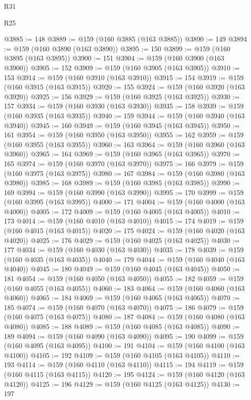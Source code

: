 \begin{lexlean}{R31}
\begin{lexlean}{R25}
\begin{coremodule}
{{{{{{{{{{{{{{{{{{{{{{{{{{{{{{{{{{{{{{{{{{{{{{{{{{{{{{{{{{{{{{{{{{{{{{{{{{{{{{{{{{{{{{{{{{{{{{{{{{{{{{{{{{{{{{{{{{{{{{{{{{{{{{{{{{{{{{{{{{{{{{{{{{{{{{{{{{{{{{{{{{{{{{{{{{{{{{{{{{{{{{{{{{{{{{{{{{{{{{{@3885 := 148
@3889 := @159 (@160 @3885 (@163 @3885))
@3890 := 149
@3894 := @159 (@160 @3890 (@163 @3890))
@3895 := 150
@3899 := @159 (@160 @3895 (@163 @3895))
@3900 := 151
@3904 := @159 (@160 @3900 (@163 @3900))
@3905 := 152
@3909 := @159 (@160 @3905 (@163 @3905))
@3910 := 153
@3914 := @159 (@160 @3910 (@163 @3910))
@3915 := 154
@3919 := @159 (@160 @3915 (@163 @3915))
@3920 := 155
@3924 := @159 (@160 @3920 (@163 @3920))
@3925 := 156
@3929 := @159 (@160 @3925 (@163 @3925))
@3930 := 157
@3934 := @159 (@160 @3930 (@163 @3930))
@3935 := 158
@3939 := @159 (@160 @3935 (@163 @3935))
@3940 := 159
@3944 := @159 (@160 @3940 (@163 @3940))
@3945 := 160
@3949 := @159 (@160 @3945 (@163 @3945))
@3950 := 161
@3954 := @159 (@160 @3950 (@163 @3950))
@3955 := 162
@3959 := @159 (@160 @3955 (@163 @3955))
@3960 := 163
@3964 := @159 (@160 @3960 (@163 @3960))
@3965 := 164
@3969 := @159 (@160 @3965 (@163 @3965))
@3970 := 165
@3974 := @159 (@160 @3970 (@163 @3970))
@3975 := 166
@3979 := @159 (@160 @3975 (@163 @3975))
@3980 := 167
@3984 := @159 (@160 @3980 (@163 @3980))
@3985 := 168
@3989 := @159 (@160 @3985 (@163 @3985))
@3990 := 169
@3994 := @159 (@160 @3990 (@163 @3990))
@3995 := 170
@3999 := @159 (@160 @3995 (@163 @3995))
@4000 := 171
@4004 := @159 (@160 @4000 (@163 @4000))
@4005 := 172
@4009 := @159 (@160 @4005 (@163 @4005))
@4010 := 173
@4014 := @159 (@160 @4010 (@163 @4010))
@4015 := 174
@4019 := @159 (@160 @4015 (@163 @4015))
@4020 := 175
@4024 := @159 (@160 @4020 (@163 @4020))
@4025 := 176
@4029 := @159 (@160 @4025 (@163 @4025))
@4030 := 177
@4034 := @159 (@160 @4030 (@163 @4030))
@4035 := 178
@4039 := @159 (@160 @4035 (@163 @4035))
@4040 := 179
@4044 := @159 (@160 @4040 (@163 @4040))
@4045 := 180
@4049 := @159 (@160 @4045 (@163 @4045))
@4050 := 181
@4054 := @159 (@160 @4050 (@163 @4050))
@4055 := 182
@4059 := @159 (@160 @4055 (@163 @4055))
@4060 := 183
@4064 := @159 (@160 @4060 (@163 @4060))
@4065 := 184
@4069 := @159 (@160 @4065 (@163 @4065))
@4070 := 185
@4074 := @159 (@160 @4070 (@163 @4070))
@4075 := 186
@4079 := @159 (@160 @4075 (@163 @4075))
@4080 := 187
@4084 := @159 (@160 @4080 (@163 @4080))
@4085 := 188
@4089 := @159 (@160 @4085 (@163 @4085))
@4090 := 189
@4094 := @159 (@160 @4090 (@163 @4090))
@4095 := 190
@4099 := @159 (@160 @4095 (@163 @4095))
@4100 := 191
@4104 := @159 (@160 @4100 (@163 @4100))
@4105 := 192
@4109 := @159 (@160 @4105 (@163 @4105))
@4110 := 193
@4114 := @159 (@160 @4110 (@163 @4110))
@4115 := 194
@4119 := @159 (@160 @4115 (@163 @4115))
@4120 := 195
@4124 := @159 (@160 @4120 (@163 @4120))
@4125 := 196
@4129 := @159 (@160 @4125 (@163 @4125))
@4130 := 197
}}}}}}}}}}}}}}}}}}}}}}}}}}}}}}}}}}}}}}}}}}}}}}}}}}}}}}}}}}}}}}}}}}}}}}}}}}}}}}}}}}}}}}}}}}}}}}}}}}}}}}}}}}}}}}}}}}}}}}}}}}}}}}}}}}}}}}}}}}}}}}}}}}}}}}}}}}}}}}}}}}}}}}}}}}}}}}}}}}}}}}}}}}}}}}}}}}}}}}}
\end{coremodule}
\end{lexlean}
\end{lexlean}
